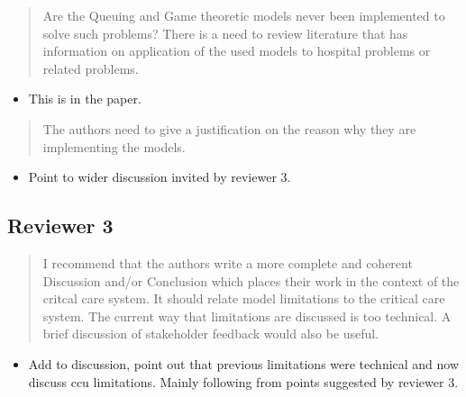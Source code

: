 \documentclass{article}
\begin{document}
\begin{quote}
    \begin{textit}{
    Are the Queuing and Game theoretic models never been implemented to solve such problems? There is a need to review literature that has information on application of the used models to hospital problems or related problems.
    }\end{textit}
\end{quote}

\begin{itemize}
    \item This is in the paper.
\end{itemize}

\begin{quote}
    \begin{textit}{
The authors need to give a justification on the reason why they are implementing the models.
    }\end{textit}
\end{quote}

\begin{itemize}
    \item Point to wider discussion invited by reviewer 3.
\end{itemize}

\subsection{Reviewer 3}


\begin{quote}
    \begin{textit}
        {I recommend that the authors write a more complete and coherent
        Discussion and/or Conclusion which places their work in the context of
        the critcal care system.  It should relate model limitations to the
        critical care system. The current way that limitations are discussed
        is too technical. A brief discussion of stakeholder feedback would
        also be useful.}
    \end{textit}
\end{quote}

\begin{itemize}
    \item Add to discussion, point out that previous limitations were technical and now discuss ccu limitations. Mainly following from points suggested by reviewer 3.
\end{itemize}
\end{document}
